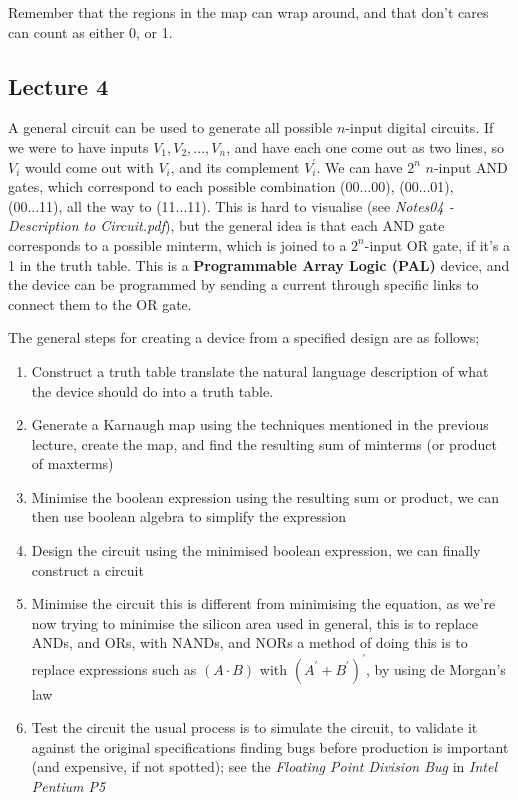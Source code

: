\documentclass[a4paper, 12pt]{article}
\begin{document}
            Remember that the regions in the map can wrap around, and that don't cares can count as either 0, or 1.
        \subsection*{Lecture 4}
            A general circuit can be used to generate all possible $n$-input digital circuits. If we were to have inputs $V_1, V_2, ..., V_n$, and have each one come out as two lines, so $V_i$ would come out with $V_i$, and its complement $V_i^\prime$. We can have $2^n$ $n$-input AND gates, which correspond to each possible combination (00...00), (00...01), (00...11), all the way to (11...11). This is hard to visualise (see \textit{Notes04 - Description to Circuit.pdf}), but the general idea is that each AND gate corresponds to a possible minterm, which is joined to a $2^n$-input OR gate, if it's a 1 in the truth table. This is a \textbf{Programmable Array Logic (PAL)} device, and the device can be programmed by sending a current through specific links to connect them to the OR gate.
            \medskip

            The general steps for creating a device from a specified design are as follows;
            \begin{enumerate}[1.]
                \itemsep0em
                \item Construct a truth table
                    \subitem translate the natural language description of what the device should do into a truth table.
                \item Generate a Karnaugh map
                    \subitem using the techniques mentioned in the previous lecture, create the map, and find the resulting sum of minterms (or product of maxterms)
                \item Minimise the boolean expression
                    \subitem using the resulting sum or product, we can then use boolean algebra to simplify the expression
                \item Design the circuit
                    \subitem using the minimised boolean expression, we can finally construct a circuit
                \item Minimise the circuit
                    \subitem this is different from minimising the equation, as we're now trying to minimise the silicon area used
                    \subitem in general, this is to replace ANDs, and ORs, with NANDs, and NORs
                    \subitem a method of doing this is to replace expressions such as $(A \cdot B)$ with $(A^\prime + B^\prime)^\prime$, by using de Morgan's law
                \item Test the circuit
                    \subitem the usual process is to simulate the circuit, to validate it against the original specifications
                    \subitem finding bugs before production is important (and expensive, if not spotted); see the \textit{Floating Point Division Bug} in \textit{Intel Pentium P5}
            \end{enumerate}
\end{document}
